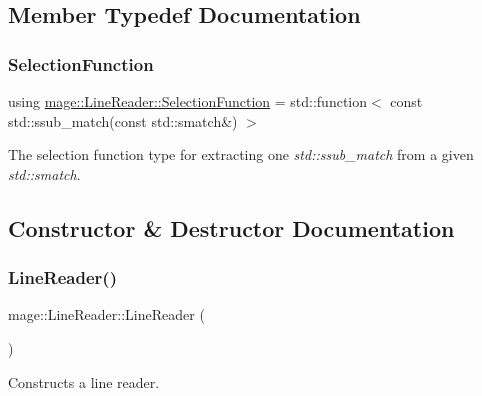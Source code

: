 \subsection{Member Typedef Documentation}
\mbox{\label{classmage_1_1_line_reader_a17bbae61a3ce30bdb251d6c76e1a4522}} 
\subsubsection{\texorpdfstring{Selection\+Function}{SelectionFunction}}
{\footnotesize\ttfamily using \mbox{\hyperlink{classmage_1_1_line_reader_a17bbae61a3ce30bdb251d6c76e1a4522}{mage\+::\+Line\+Reader\+::\+Selection\+Function}} =  std\+::function$<$ const std\+::ssub\+\_\+match(const std\+::smatch\&) $>$}

The selection function type for extracting one {\itshape std\+::ssub\+\_\+match} from a given {\itshape std\+::smatch}. 

\subsection{Constructor \& Destructor Documentation}
\mbox{\label{classmage_1_1_line_reader_ab4a46321d7ea3ecda2d6390c78a7285b}} 
\subsubsection{\texorpdfstring{Line\+Reader()}{LineReader()}\hspace{0.1cm}{\footnotesize\ttfamily [1/3]}}
{\footnotesize\ttfamily mage\+::\+Line\+Reader\+::\+Line\+Reader (\begin{DoxyParamCaption}{ }\end{DoxyParamCaption})\hspace{0.3cm}{\ttfamily [protected]}}

Constructs a line reader. \mbox{\label{classmage_1_1_line_reader_ae4f871bebae110704b34c0bd88460639}} 
